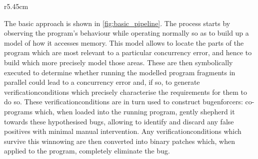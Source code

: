 \begin{wrapfigure}{r}{5.45cm}
  \vspace{-14pt}
  \vspace{-24pt}
\end{wrapfigure}
The basic approach is shown in \autoref{fig:basic_pipeline}.  The
process starts by observing the program's behaviour while operating
normally so as to build up a model of how it accesses memory.  This
model allows {\technique} to locate the parts of the program which are
most relevant to a particular concurrency error, and hence to build
\emph{\StateMachines} which more precisely model those areas.  These
     {\StateMachines} are then symbolically executed to determine
     whether running the modelled program fragments in parallel could
     lead to a concurrency error and, if so, to generate
     \glspl{verificationcondition} which precisely characterise the
     requirements for them to do so.  These
     \glspl{verificationcondition} are in turn used to construct
     \glspl{bugenforcer}: co-programs which, when loaded into the
     running program, gently shepherd it towards these hypothesised
     bugs, allowing {\technique} to identify and discard any false
     positives with minimal manual intervention.  Any
     \glspl{verificationcondition} which survive this winnowing are
     then converted into binary patches which, when applied to the
     program, completely eliminate the bug.

